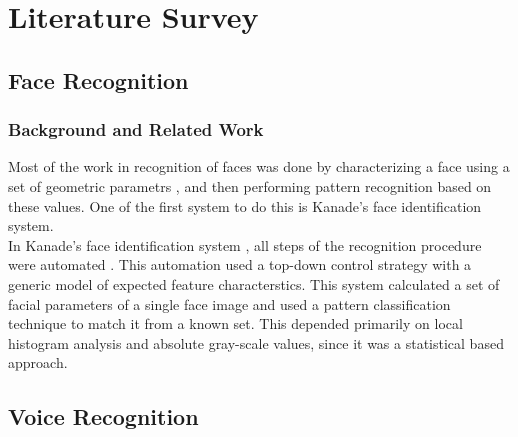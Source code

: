 
\chapter{Literature Survey}

\section{Face Recognition}

\subsection{Background and Related Work}
Most of the work in recognition of faces was done by characterizing a face using a set of geometric parametrs , and then performing pattern recognition based on these values. One of the first system to do this is Kanade's face identification system. \\
In Kanade's face identification system \cite{Kanade1973}, all steps of the recognition procedure were automated . This automation used a top-down control strategy with a generic model of expected feature characterstics. This system calculated a set of facial parameters of a single face image and used a pattern classification technique to match it from a known set. This depended primarily on local histogram analysis and absolute gray-scale values, since it was a statistical based approach. \\

\section{Voice Recognition}

